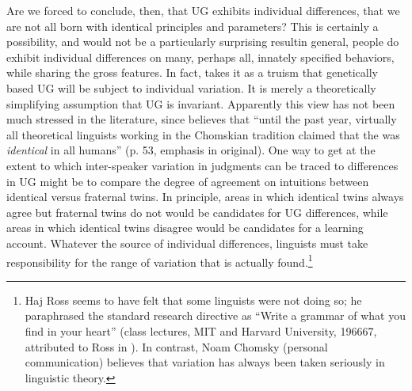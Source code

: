  Are we forced to conclude, then, that UG exhibits individual differences, that we are not all born with identical principles and parameters? This is certainly a possibility, and would not be a particularly surprising result\schdash{}in general, people do exhibit individual differences on many, perhaps all, innately specified behaviors, while sharing the gross features. In fact, \citet{Chomsky1991} takes it as a\label{ChomskyPrefacestart}
 truism that genetically based UG will be subject to individual variation.  It is merely a theoretically simplifying assumption that UG is invariant. Apparently this view has not been much stressed in the literature, since \citet{Lieberman1991} believes that ``until the past year, virtually all theoretical linguists working in the Chomskian tradition claimed that the  was \textit{identical} in all humans'' (p. 53, emphasis in original). One way to get at the extent to which inter-speaker variation in judgments can be traced to differences in UG might be to compare the degree of agreement on intuitions between identical versus fraternal twins. In principle, areas in which identical twins always agree but fraternal twins do not would be candidates for UG differences, while areas in which identical twins disagree would be candidates for a learning account. Whatever the source of individual differences, linguists must take responsibility for the range of variation that is actually found.\footnote{Haj Ross seems to have felt that some linguists were not doing so; he paraphrased the standard research directive as ``Write a grammar of what you find in your heart'' (class lectures, MIT and Harvard University, 1966\textendash{}67, attributed to Ross in \citet{Carden1973}). In contrast, Noam Chomsky (personal communication) believes that variation has always been taken seriously in linguistic theory.}\label{ChomskyPrefaceend}


